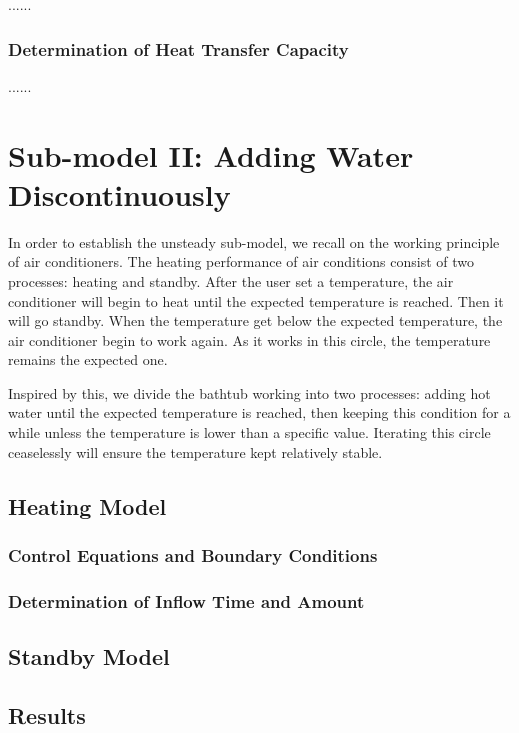 \documentclass{mcmthesis}
\begin{document}
......

\subsubsection{Determination of Heat Transfer Capacity}

......

\section{Sub-model II: Adding Water Discontinuously}

In order to establish the unsteady sub-model, we recall on the working principle 
of air conditioners. The heating performance of air conditions consist of two 
processes: heating and standby. After the user set a temperature, the air 
conditioner will begin to heat until the expected temperature is reached. Then 
it will go standby. When the temperature get below the expected temperature, 
the air conditioner begin to work again. As it works in this circle, the 
temperature remains the expected one.

Inspired by this, we divide the bathtub working into two processes: adding
hot water until the expected temperature is reached, then keeping this
condition for a while unless the temperature is lower than a specific value. 
Iterating this circle ceaselessly will ensure the temperature kept relatively 
stable.

\subsection{Heating Model}

\subsubsection{Control Equations and Boundary Conditions}

\subsubsection{Determination of Inflow Time and Amount}

\subsection{Standby Model}

\subsection{Results}
\end{document}
